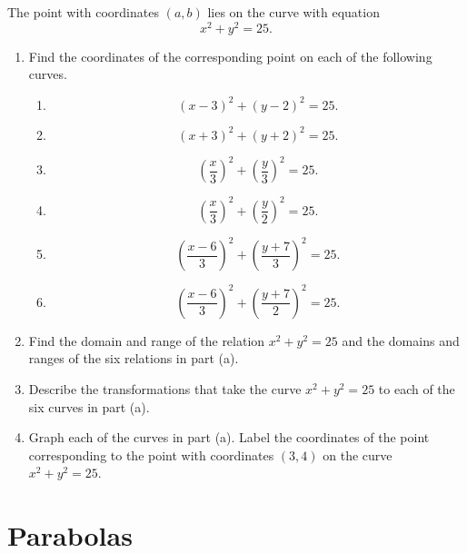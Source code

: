 \documentclass{ximera}
\begin{document}
\begin{question} \label{Qpdf3r000}
The point with coordinates $(a,b)$ lies on the curve with equation
\[
  x^2 + y^2 = 25.
\]

\begin{enumerate}
\item Find the coordinates of the corresponding point on each of the following curves.

\begin{enumerate}
\item 
\[
   (x-3)^2 + (y-2)^2 = 25.
\]

\item 
\[
   (x+3)^2 + (y+2)^2 = 25.
\]

\item 
\[
   \left( \frac{x}{3} \right)^2 + \left( \frac{y}{3} \right)^2 = 25.
\]

\item 
\[
   \left( \frac{x}{3} \right)^2 + \left( \frac{y}{2} \right)^2 = 25.
\]

\item 
\[
   \left( \frac{x-6}{3} \right)^2 + \left( \frac{y+7}{3} \right)^2 = 25.
\]

\item 
\[
   \left( \frac{x-6}{3} \right)^2 + \left( \frac{y+7}{2} \right)^2 = 25.
\]

\end{enumerate}

\item Find the domain and range of the relation $x^2 + y^2 = 25$ and the domains and ranges of the six relations in part (a).

\item Describe the transformations that take the curve $x^2 + y^2 = 25$ to each of the six curves in part (a).

\item Graph each of the curves in part (a). Label the coordinates of the point corresponding to the point with coordinates $(3,4)$ on the curve $x^2 + y^2 = 25$.
\end{enumerate}

\end{question}


\section{Parabolas}
\end{document}
